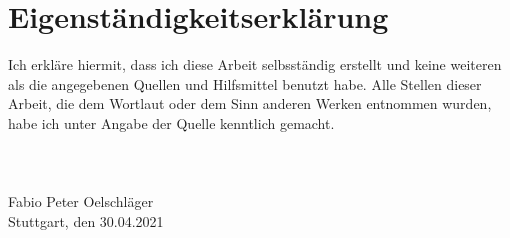 \chapter{Eigenständigkeitserklärung}
Ich erkläre hiermit, dass ich diese Arbeit selbsständig erstellt
und keine weiteren als die angegebenen Quellen und Hilfsmittel
benutzt habe. Alle Stellen dieser Arbeit, die dem Wortlaut oder
dem Sinn anderen Werken entnommen wurden, habe ich unter Angabe
der Quelle kenntlich gemacht.\\
\\
\\
\\
Fabio Peter Oelschläger\\
Stuttgart, den 30.04.2021
